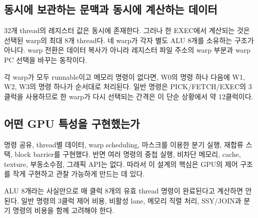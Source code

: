 \documentclass[a4paper,11pt]{article}
\begin{document}
\subsection{동시에 보관하는 문맥과 동시에 계산하는 데이터}
32개 thread의 레지스터 값은 동시에 존재한다. 그러나 한 EXEC에서 계산되는 것은 선택된 warp의 최대 8개 thread다. 네 warp가 각자 별도 ALU 8개를 소유하는 구조가 아니다. warp 전환은 데이터 복사가 아니라 레지스터 파일 주소의 warp 부분과 warp PC 선택을 바꾸는 동작이다.

각 warp가 모두 runnable이고 메모리 명령이 없다면, W0의 명령 하나 다음에 W1, W2, W3의 명령 하나가 순서대로 처리된다. 일반 명령은 PICK/FETCH/EXEC의 3클럭을 사용하므로 한 warp가 다시 선택되는 간격은 이 단순 상황에서 약 12클럭이다.
\subsection{어떤 GPU 특성을 구현했는가}
명령 공유, thread별 데이터, warp scheduling, 마스크를 이용한 분기 실행, 재합류 스택, block barrier를 구현했다. 반면 여러 명령의 중첩 실행, 비차단 메모리, cache, texture, 부동소수점, 그래픽 API는 없다. 따라서 이 설계의 핵심은 GPU의 제어 구조를 작게 구현하고 관찰 가능하게 만드는 데 있다.
\begin{keybox}[성능 수치 해석]
ALU 8개라는 사실만으로 매 클럭 8개의 유효 thread 명령이 완료된다고 계산하면 안 된다. 일반 명령의 3클럭 제어 비용, 비활성 lane, 메모리 직렬 처리, SSY/JOIN과 분기 명령의 비용을 함께 고려해야 한다.
\end{keybox}
\end{document}
